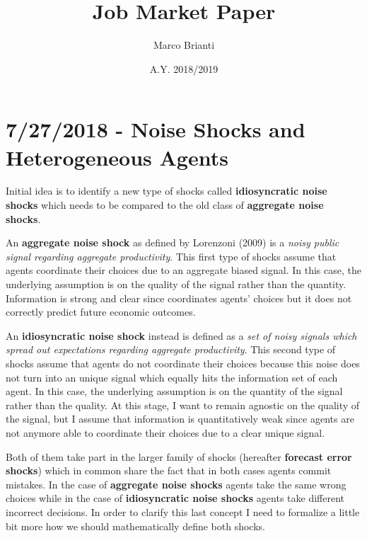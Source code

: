 \documentclass{article}
\title{Job Market Paper}
\author{Marco Brianti}
\date{A.Y. 2018/2019}
\begin{document}
	\large{

\maketitle

\section*{7/27/2018 - Noise Shocks and Heterogeneous Agents}

Initial idea is to identify a new type of shocks called \textbf{idiosyncratic noise shocks} which needs to be compared to the old class of \textbf{aggregate noise shocks}. 

An \textbf{aggregate noise shock} as defined by Lorenzoni (2009) is a \textit{noisy public signal regarding aggregate productivity}. This first type of shocks assume that agents coordinate their choices due to an aggregate biased signal. In this case, the underlying assumption is on the quality of the signal rather than the quantity. Information is strong and clear since coordinates agents' choices but it does not correctly predict future economic outcomes.

An \textbf{idiosyncratic noise shock} instead is defined as a \textit{set of noisy signals which spread out expectations regarding aggregate productivity}. This second type of shocks assume that agents do not coordinate their choices because this noise does not turn into an unique signal which equally hits the information set of each agent. In this case, the underlying assumption is on the quantity of the signal rather than the quality. At this stage, I want to remain agnostic on the quality of the signal, but I assume that information is quantitatively weak since agents are not anymore able to coordinate their choices due to a clear unique signal. 

Both of them take part in the larger family of shocks (hereafter \textbf{forecast error shocks}) which in common share the fact that in both cases agents commit mistakes. In the case of \textbf{aggregate noise shocks} agents take the same wrong choices while in the case of \textbf{idiosyncratic noise shocks} agents take different incorrect decisions. In order to clarify this last concept I need to formalize a little bit more how we should mathematically define both shocks.

}
\end{document}
